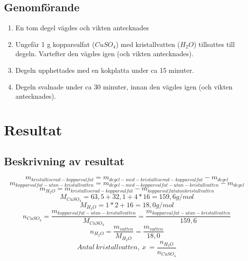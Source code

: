 \documentclass{article}
\begin{document}
	\subsection{Genomförande}
	
	\begin{enumerate}
		\item En tom degel vägdes och vikten antecknades
		\item Ungefär 1 g kopparsulfat ($CuSO_4$) med kristallvatten ($H_2O$) tillsattes till degeln. Vartefter den vägdes igen (och vikten antecknades).
		\item Degeln upphettades med en kokplatta under ca 15 minuter.
		\item Degeln svalnade under ca 30 minuter, innan den vägdes igen (och vikten antecknades). 
	\end{enumerate}
	\section{Resultat}
	\subsection{Beskrivning av resultat}
	\[m_{kristalliserad-kopparsulfat}=m_{degel-med-kristalliserad-kopparsulfat}-m_{degel}\]
	\[m_{kopparsulfat-utan-kristallvatten}=m_{degel-med-kopparsulfat-utan-kristallvatten}-m_{degel}\]
	\[m_{H_2O}=m_{kristalliserad-kopparsulfat}-m_{kopparsulfat utan kristallvatten}\]
	\[M_{CuSO_4}=63,5+32,1+4*16=159,6 g/mol\]
	\[M_{H_2O}=1*2+16=18,0 g/mol\]
	\[n_{CuSO_4}=\frac{m_{kopparsulfat-utan-kristallvatten}}{M_{CuSO_4}}=\frac{m_{kopparsulfat-utan-kristallvatten}}{159,6}\]
	\[n_{H_2O}=\frac{m_{vatten}}{M_{H_2O}}=\frac{m_{vatten}}{18,0}\]
	\[Antal\: kristallvatten,\: x \: =\frac{n_{H_2O}}{n_{CuSO_4}}\]
	\[\]
\end{document}
